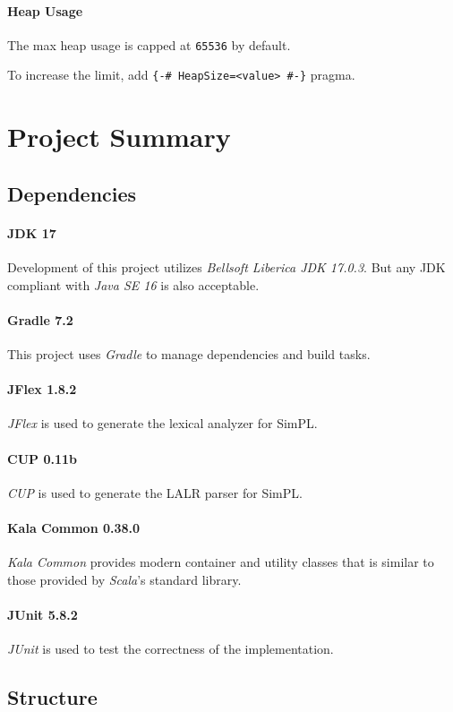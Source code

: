 \documentclass[a4paper]{article}
\begin{document}
\paragraph{Heap Usage} The max heap usage is capped at \texttt{65536} by default.

To increase the limit, add \texttt{\{-\# HeapSize=<value> \#-\}} pragma.

\section{Project Summary}

\subsection{Dependencies}
\paragraph{JDK 17} Development of this project utilizes \textit{Bellsoft Liberica JDK 17.0.3}. But any JDK compliant with \textit{Java SE 16} is also acceptable.
\paragraph{Gradle 7.2} This project uses \textit{Gradle} to manage dependencies and build tasks.
\paragraph{JFlex 1.8.2} \textit{JFlex} is used to generate the lexical analyzer for SimPL.
\paragraph{CUP 0.11b} \textit{CUP} is used to generate the LALR parser for SimPL.
\paragraph{Kala Common 0.38.0} \textit{Kala Common} provides modern container and utility classes that is similar to those provided by \textit{Scala}'s standard library.
\paragraph{JUnit 5.8.2} \textit{JUnit} is used to test the correctness of the implementation.

\subsection{Structure}
\end{document}
